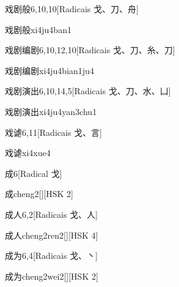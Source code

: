\begin{entry}{戏剧般}{6,10,10}[Radicais ⼽、⼑、⾈]
  \begin{phonetics}{戏剧般}{xi4ju4ban1}
  \end{phonetics}
\end{entry}

\begin{entry}{戏剧编剧}{6,10,12,10}[Radicais ⼽、⼑、⽷、⼑]
  \begin{phonetics}{戏剧编剧}{xi4ju4bian1ju4}
  \end{phonetics}
\end{entry}

\begin{entry}{戏剧演出}{6,10,14,5}[Radicais ⼽、⼑、⽔、⼐]
  \begin{phonetics}{戏剧演出}{xi4ju4yan3chu1}
  \end{phonetics}
\end{entry}

\begin{entry}{戏谑}{6,11}[Radicais ⼽、⾔]
  \begin{phonetics}{戏谑}{xi4xue4}
  \end{phonetics}
\end{entry}

\begin{entry}{成}{6}[Radical ⼽]
  \begin{phonetics}{成}{cheng2}[][HSK 2]
  \end{phonetics}
\end{entry}

\begin{entry}{成人}{6,2}[Radicais ⼽、⼈]
  \begin{phonetics}{成人}{cheng2ren2}[][HSK 4]
  \end{phonetics}
\end{entry}

\begin{entry}{成为}{6,4}[Radicais ⼽、⼂]
  \begin{phonetics}{成为}{cheng2wei2}[][HSK 2]
  \end{phonetics}
\end{entry}

